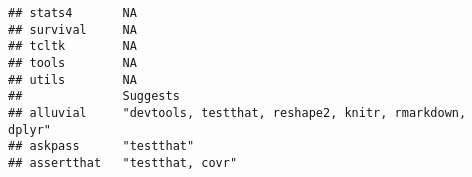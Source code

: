 \documentclass[]{book}
\begin{document}
\begin{verbatim}
## stats4       NA                                     
## survival     NA                                     
## tcltk        NA                                     
## tools        NA                                     
## utils        NA                                     
##              Suggests                                                                                                                                                                                                                                                                                                                                                                                                                                                                                                                                                                                                                                                                                                  
## alluvial     "devtools, testthat, reshape2, knitr, rmarkdown, dplyr"                                                                                                                                                                                                                                                                                                                                                                                                                                                                                                                                                                                                                                                   
## askpass      "testthat"                                                                                                                                                                                                                                                                                                                                                                                                                                                                                                                                                                                                                                                                                                
## assertthat   "testthat, covr"                                                                                                                                                                                                                                                                                                                                                                                                                                                                                                                                                                                                                                                                                          

\end{verbatim}
\end{document}
